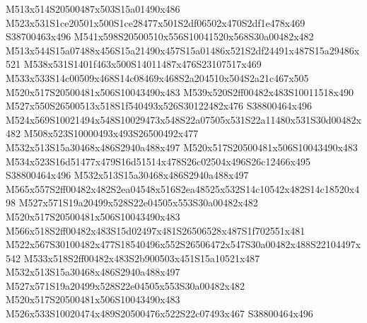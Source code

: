 \documentclass{article}
\begin{document}
\begin{multicols}{2}
M513x514S20500487x503S15a01490x486 M523x531S1ce20501x500S1ce28477x501S2df06502x470S2df1e478x469 S38700463x496 M541x598S20500510x556S10041520x568S30a00482x482 M513x544S15a07488x456S15a21490x457S15a01486x521S2df24491x487S15a29486x521 M538x531S1401f463x500S14011487x476S23107517x469 M533x533S14c00509x468S14c08469x468S2a204510x504S2a21c467x505 M520x517S20500481x506S10043490x483 M539x520S2ff00482x483S10011518x490 M527x550S26500513x518S1f540493x526S30122482x476 S38800464x496 M524x569S10021494x548S10029473x548S22a07505x531S22a11480x531S30d00482x482 M508x523S10000493x493S26500492x477 M532x513S15a30468x486S2940a488x497 M520x517S20500481x506S10043490x483 M534x523S16d51477x479S16d51514x478S26c02504x496S26c12466x495 S38800464x496 M532x513S15a30468x486S2940a488x497 M565x557S2ff00482x482S2ea04548x516S2ea48525x532S14c10542x482S14c18520x498 M527x571S19a20499x528S22e04505x553S30a00482x482 M520x517S20500481x506S10043490x483 M566x518S2ff00482x483S15d02497x481S26506528x487S1f702551x481 M522x567S30100482x477S18540496x552S26506472x547S30a00482x488S22104497x542 M533x518S2ff00482x483S2b900503x451S15a10521x487 M532x513S15a30468x486S2940a488x497 M527x571S19a20499x528S22e04505x553S30a00482x482 M520x517S20500481x506S10043490x483 M526x533S10020474x489S20500476x522S22c07493x467 S38800464x496









\end{multicols}
\end{document}

